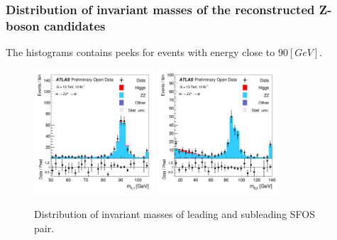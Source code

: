 \documentclass[aspectratio=1610, english]{beamer}
\begin{document}
\begin{frame}
\frametitle{Distribution of invariant masses of the reconstructed Z-boson candidates}

The histograms contains peeks for events with energy close to $90 [GeV]$.

\begin{figure} [H]
\centering
\includegraphics[width=0.4\textwidth]{hist_mLL1.png}
\includegraphics[width=0.4\textwidth]{hist_mLL2.png}
\caption{Distribution of invariant masses of leading and subleading SFOS pair. }
\end{figure}

\end{frame}
\end{document}
